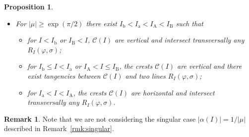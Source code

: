 \documentclass[a4paper,10pt]{article}
\newcommand{\NH}{\text{NHIM}}
\newtheorem{proposition}[theorem]{Proposition}
\theoremstyle{definition}
\newtheorem{remark}[theorem]{Remark}
\begin{document}
\begin{proposition}
\begin{itemize}
\begin{itemize}
If $I_{\text{c}} = 1/2$, from the properties of $\alpha(I)$ and $\beta(I)$ this interval is just one point.
If $I_{\text{c}}> 1/2$, the crests $\mathcal{C}(I)$ are horizontal and there exist tangencies.
\end{itemize}
\item For $\left|\mu\right| \geq \exp( \pi/2 )$ there exist $I_{\text{b}} < I_{\text{a}} < I_{\text{A}} < I_{\text{B}}$ such that
\begin{itemize}
\item for $I < I_{\text{b}}$ or $I_{\text{B}} < I$, $\mathcal{C}(I)$ are vertical and intersect transversally any $R_{I}(\varphi , \sigma)$;
\item for $ I_{\text{b}} \leq I < I_{\text{a}}$ or $ I_{\text{A}} < I \leq I_{\text{B}}$, the crests $\mathcal{C}(I)$ are vertical and there exist tangencies between $\mathcal{C}(I)$ and two {\NH} lines $R_{I}(\varphi , \sigma)$;
\item for $I_{\text{a}} < I < I_{\text{A}}$, the crests $\mathcal{C}(I)$ are horizontal and intersect transversally any $R_{I}(\varphi , \sigma)$.
\end{itemize}
\end{itemize}
\end{proposition}
\begin{remark}
Note that we are not considering the singular case $\left|\alpha(I)\right| = 1/\left|\mu\right|$ described in Remark~\ref{rmk:singular}.
\end{remark}
\end{document}
